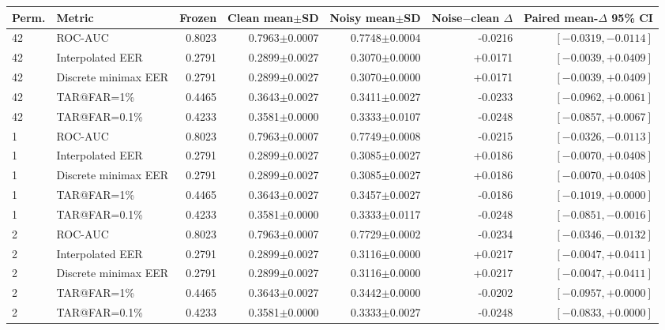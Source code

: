\setlength{\tabcolsep}{3.5pt}
\footnotesize
\begin{tabular}{@{}llrrrrr@{}}
\toprule
Perm. & Metric & Frozen & Clean mean$\pm$SD & Noisy mean$\pm$SD & Noise$-$clean $\Delta$ & Paired mean-$\Delta$ 95\% CI \\
\midrule
42 & ROC-AUC & 0.8023 & 0.7963$\pm$0.0007 & 0.7748$\pm$0.0004 & -0.0216 & $[-0.0319,-0.0114]$ \\
42 & Interpolated EER & 0.2791 & 0.2899$\pm$0.0027 & 0.3070$\pm$0.0000 & +0.0171 & $[-0.0039,+0.0409]$ \\
42 & Discrete minimax EER & 0.2791 & 0.2899$\pm$0.0027 & 0.3070$\pm$0.0000 & +0.0171 & $[-0.0039,+0.0409]$ \\
42 & TAR@FAR=1\% & 0.4465 & 0.3643$\pm$0.0027 & 0.3411$\pm$0.0027 & -0.0233 & $[-0.0962,+0.0061]$ \\
42 & TAR@FAR=0.1\% & 0.4233 & 0.3581$\pm$0.0000 & 0.3333$\pm$0.0107 & -0.0248 & $[-0.0857,+0.0067]$ \\
1 & ROC-AUC & 0.8023 & 0.7963$\pm$0.0007 & 0.7749$\pm$0.0008 & -0.0215 & $[-0.0326,-0.0113]$ \\
1 & Interpolated EER & 0.2791 & 0.2899$\pm$0.0027 & 0.3085$\pm$0.0027 & +0.0186 & $[-0.0070,+0.0408]$ \\
1 & Discrete minimax EER & 0.2791 & 0.2899$\pm$0.0027 & 0.3085$\pm$0.0027 & +0.0186 & $[-0.0070,+0.0408]$ \\
1 & TAR@FAR=1\% & 0.4465 & 0.3643$\pm$0.0027 & 0.3457$\pm$0.0027 & -0.0186 & $[-0.1019,+0.0000]$ \\
1 & TAR@FAR=0.1\% & 0.4233 & 0.3581$\pm$0.0000 & 0.3333$\pm$0.0117 & -0.0248 & $[-0.0851,-0.0016]$ \\
2 & ROC-AUC & 0.8023 & 0.7963$\pm$0.0007 & 0.7729$\pm$0.0002 & -0.0234 & $[-0.0346,-0.0132]$ \\
2 & Interpolated EER & 0.2791 & 0.2899$\pm$0.0027 & 0.3116$\pm$0.0000 & +0.0217 & $[-0.0047,+0.0411]$ \\
2 & Discrete minimax EER & 0.2791 & 0.2899$\pm$0.0027 & 0.3116$\pm$0.0000 & +0.0217 & $[-0.0047,+0.0411]$ \\
2 & TAR@FAR=1\% & 0.4465 & 0.3643$\pm$0.0027 & 0.3442$\pm$0.0000 & -0.0202 & $[-0.0957,+0.0000]$ \\
2 & TAR@FAR=0.1\% & 0.4233 & 0.3581$\pm$0.0000 & 0.3333$\pm$0.0027 & -0.0248 & $[-0.0833,+0.0000]$ \\
\bottomrule
\end{tabular}